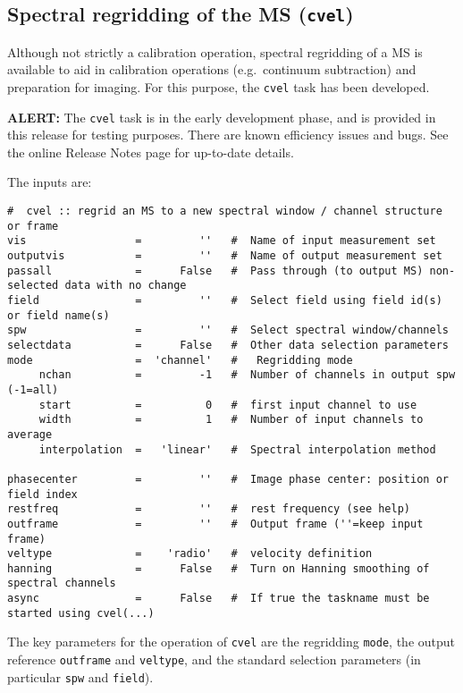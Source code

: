 \subsection{Spectral regridding of the MS ({\tt cvel})}
\label{section:cal.other.cvel}

Although not strictly a calibration operation, spectral regridding
of a MS is available to aid in calibration operations (e.g.\ continuum
subtraction) and preparation for imaging.  For this purpose, the
{\tt cvel} task has been developed.  

{\bf ALERT:} The {\tt cvel} task is in the early development phase,
and is provided in this release for testing purposes.  There are known
efficiency issues and bugs.  See the online Release Notes page for
up-to-date details.

The inputs are:
\small
\begin{verbatim}
#  cvel :: regrid an MS to a new spectral window / channel structure or frame
vis                 =         ''   #  Name of input measurement set
outputvis           =         ''   #  Name of output measurement set
passall             =      False   #  Pass through (to output MS) non-selected data with no change
field               =         ''   #  Select field using field id(s) or field name(s)
spw                 =         ''   #  Select spectral window/channels
selectdata          =      False   #  Other data selection parameters
mode                =  'channel'   #   Regridding mode
     nchan          =         -1   #  Number of channels in output spw (-1=all)
     start          =          0   #  first input channel to use
     width          =          1   #  Number of input channels to average
     interpolation  =   'linear'   #  Spectral interpolation method

phasecenter         =         ''   #  Image phase center: position or field index
restfreq            =         ''   #  rest frequency (see help)
outframe            =         ''   #  Output frame (''=keep input frame)
veltype             =    'radio'   #  velocity definition
hanning             =      False   #  Turn on Hanning smoothing of spectral channels
async               =      False   #  If true the taskname must be started using cvel(...)
\end{verbatim}
\normalsize

The key parameters for the operation of {\tt cvel} are the regridding
{\tt mode}, the output reference {\tt outframe} and {\tt veltype}, and
the standard selection parameters (in particular {\tt spw} and {\tt field}).

